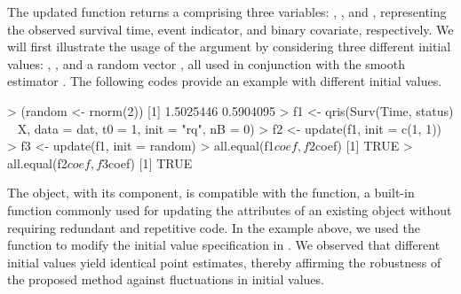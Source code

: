The updated  function returns a  comprising three variables: 
, , and , representing the 
observed survival time, event indicator, and binary covariate, respectively. 
We will first illustrate the usage of the argument  by considering three different initial values: 
, , and a random vector , 
all used in conjunction with the smooth estimator .
The following codes provide an example with different initial values. 
\begin{example}
  > (random <- rnorm(2))
  [1] 1.5025446 0.5904095
  > f1 <- qris(Surv(Time, status) ~ X, data = dat, t0 = 1, init = "rq", nB = 0)
  > f2 <- update(f1, init = c(1, 1))
  > f3 <- update(f1, init = random)
  > all.equal(f1$coef, f2$coef)
  [1] TRUE
  > all.equal(f2$coef, f3$coef)
  [1] TRUE
\end{example}

The  object, with its  component, 
is compatible with the  function, 
a built-in function commonly used for updating the 
attributes of an existing object without requiring redundant and repetitive code. 
In the example above, we used the  function to modify the initial value specification in .
We observed that different initial values yield identical point estimates, thereby affirming the robustness of the proposed method against fluctuations in initial values.

